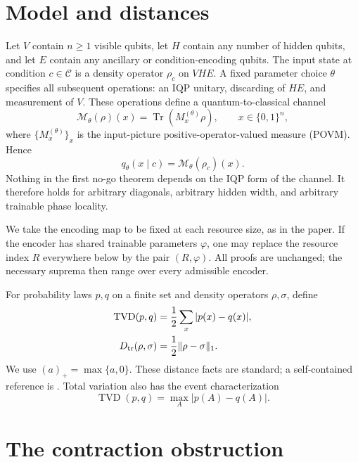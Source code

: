 \documentclass[11pt]{article}
\theoremstyle{definition}
\theoremstyle{remark}
\newcommand{\bits}{\{0,1\}}
\newcommand{\TVD}{\operatorname{TVD}}
\newcommand{\Tr}{\operatorname{Tr}}
\newcommand{\cM}{\mathcal{M}}
\newcommand{\cC}{\mathcal{C}}
\begin{document}
\section{Model and distances}
\label{sec:model}

Let $V$ contain $n\geq1$ visible qubits, let $H$ contain any number of hidden
qubits, and let $E$ contain any ancillary or condition-encoding qubits.  The
input state at condition $c\in\cC$ is a density operator $\rho_c$ on
$VHE$.  A fixed parameter choice $\theta$ specifies all subsequent operations:
an IQP unitary, discarding of $HE$, and measurement of $V$.  These operations
define a quantum-to-classical channel
\begin{equation}
  \cM_\theta(\rho)(x)=\Tr(M_x^{(\theta)}\rho),
  \qquad x\in\bits^n,
  \label{eq:povm-channel}
\end{equation}
where $\{M_x^{(\theta)}\}_x$ is the input-picture positive-operator-valued
measure (POVM).  Hence
\begin{equation}
  q_\theta(x\mid c)=\cM_\theta(\rho_c)(x).
  \label{eq:conditional-output}
\end{equation}
Nothing in the first no-go theorem depends on the IQP form of the channel.
It therefore holds for arbitrary diagonals, arbitrary hidden width, and
arbitrary trainable phase locality.

We take the encoding map to be fixed at each resource size, as in the paper.
If the encoder has shared trainable parameters $\varphi$, one may replace the
resource index $R$ everywhere below by the pair $(R,\varphi)$.  All proofs are
unchanged; the necessary suprema then range over every admissible encoder.

For probability laws $p,q$ on a finite set and density operators $\rho,\sigma$,
define
\begin{align}
  \TVD(p,q)&=\frac12\sum_x|p(x)-q(x)|,
  \label{eq:tvd-definition}\\
  D_{\rm tr}(\rho,\sigma)&=\frac12\lVert\rho-\sigma\rVert_1.
  \label{eq:trace-definition}
\end{align}
We use $(a)_+=\max\{a,0\}$.  These distance facts are standard; a
self-contained reference is \citet{watrousTheoryQuantumInformation2018}.
Total variation also has the event
characterization
\begin{equation}
  \TVD(p,q)=\max_A |p(A)-q(A)|.
  \label{eq:tvd-event}
\end{equation}

\section{The contraction obstruction}
\label{sec:contraction}
\end{document}
